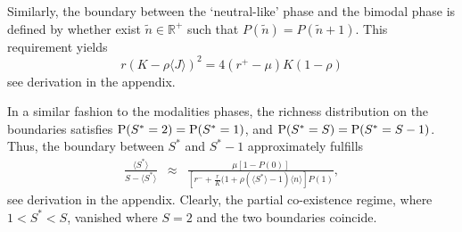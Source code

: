 \documentclass[9pt,lineno]{elife}
\begin{document}
Similarly, the boundary between the `neutral-like' phase and the bimodal phase is defined by whether exist $\tilde{n} \in {\mathbb R}^+ $ such that 
$
    P(\tilde{n})=P(\tilde{n}+1)
$.
This requirement yields
\begin{equation}
r(K-\rho \langle J\rangle )^2=4(r^+-\mu){K(1-\rho)} 
\end{equation}
see derivation in the appendix.

In a similar fashion to the modalities phases, the richness distribution on the boundaries satisfies  ${\rm P}(S^*=2)={\rm P}(S^*=1)$, and ${\rm P}(S^*=S)={\rm P}(S^*=S-1)$. Thus, the boundary between $S^*$ and $S^*-1$ approximately fulfills
\begin{eqnarray}
\frac{\langle S^* \rangle }{S-\langle S^* \rangle} 
    &\approx&\frac{\mu[1-P(0)]}{ [r^-+\frac{r}{K}(1+\rho (\langle S^* \rangle-1)\langle n \rangle] P(1)},
\end{eqnarray}
see derivation in the appendix.
Clearly, the partial co-existence regime, where $1<S^*<S$, vanished where $S=2$ and the two boundaries coincide. 



\end{document}
